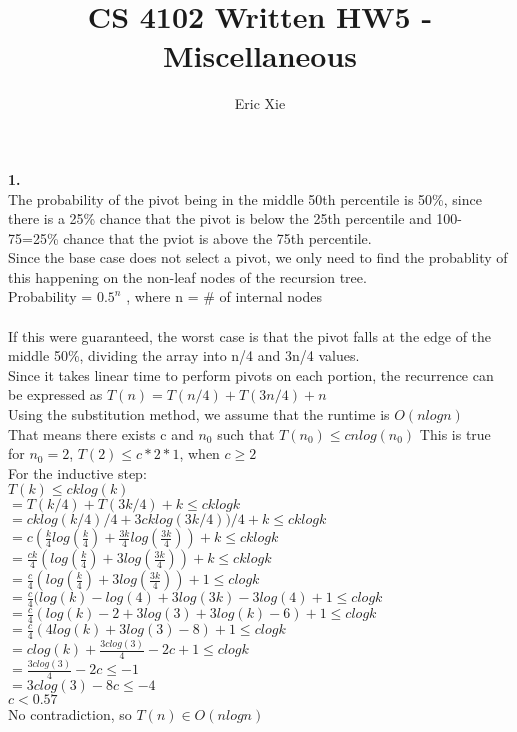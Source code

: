 \documentclass[a4paper,12pt]{article}
\title{CS 4102 Written HW5 - Miscellaneous}
\author{Eric Xie}
\begin{document}
\maketitle
\noindent \textbf{1.} \\
The probability of the pivot being in the middle 50th percentile is 50\%, since there is a 25\% chance that the pivot is below the 25th percentile and 100-75=25\% chance that the pviot is above the 75th percentile. \\
Since the base case does not select a pivot, we only need to find the probablity of this happening on the non-leaf nodes of the recursion tree. \\
Probability = $0.5^n$ , where  n = \# of internal nodes \\\\

If this were guaranteed, the worst case is that the pivot falls at the edge of the middle 50\%, dividing the array into n/4 and 3n/4 values. \\
Since it takes linear time to perform pivots on each portion, the recurrence can be expressed as $T(n)=T(n/4)+T(3n/4)+n$\\
Using the substitution method, we assume that the runtime is $O(nlogn)$\\
That means there exists c and $n_0$ such that $T(n_0)\leq cnlog(n_0)$
This is true for $n_0=2$, $T(2)\leq c*2*1$, when $c\geq2$ \\

\noindent For the inductive step:\\
$T(k)\leq cklog(k)$\\
$= T(k/4)+T(3k/4)+k \leq cklogk$\\
$= cklog(k/4)/4+3cklog(3k/4))/4+k \leq cklogk$\\
$= c(\frac{k}{4}log(\frac{k}{4})+\frac{3k}{4}log(\frac{3k}{4}))+k \leq cklogk$\\
$= \frac{ck}{4}(log(\frac{k}{4})+3log(\frac{3k}{4}))+k \leq cklogk$\\
$= \frac{c}{4}(log(\frac{k}{4})+3log(\frac{3k}{4}))+1 \leq clogk$\\
$= \frac{c}{4}(log(k)-log(4)+3log(3k)-3log(4)+1 \leq clogk$\\
$= \frac{c}{4}(log(k)-2+3log(3)+3log(k)-6)+1 \leq clogk$\\
$= \frac{c}{4}(4log(k)+3log(3)-8)+1 \leq clogk$\\
$= clog(k)+\frac{3clog(3)}{4}-2c+1 \leq clogk$\\
$= \frac{3clog(3)}{4}-2c \leq -1$\\
$= 3clog(3)-8c \leq -4$ \\
$c<0.57$ \\
No contradiction, so $T(n) \in O(nlogn)$\\
\end{document}

